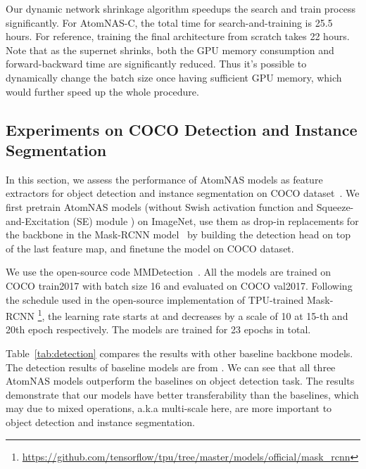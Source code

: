 \documentclass{article} \usepackage{iclr2020_conference,times}
\begin{document}
Our dynamic network shrinkage algorithm speedups the search and train process significantly. For AtomNAS-C, the total time for search-and-training is 25.5 hours. For reference, training the final architecture from scratch takes 22 hours.
Note that as the supernet shrinks, both the GPU memory consumption and forward-backward time are significantly reduced. Thus it's possible to dynamically change the batch size once having sufficient GPU memory, which would further speed up the whole procedure. 


\subsection{Experiments on COCO Detection and Instance Segmentation}
\label{sub:exp_coco}

In this section, we assess the performance of AtomNAS models as feature extractors for object detection and instance segmentation on COCO dataset~\citep{lin2014mscoco}. We first pretrain AtomNAS models (without Swish activation function \citep{ramachandran2018swish} and Squeeze-and-Excitation (SE) module \citep{hu2018se}) on ImageNet, use them as drop-in replacements for the backbone in the Mask-RCNN model~\citep{he2017maskrcnn} by building the detection head on top of the last feature map, and finetune the model on COCO dataset.

We use the open-source code MMDetection~\citep{kai2019mmdetection}. All the models are trained on COCO train2017 with batch size 16 and evaluated on COCO val2017. Following the schedule used in the open-source implementation of TPU-trained
Mask-RCNN \footnote{\url{https://github.com/tensorflow/tpu/tree/master/models/official/mask_rcnn}}, the learning rate starts at  and decreases by a scale of 10 at 15-th and 20th epoch respectively. The models are trained for 23 epochs in total.

Table~\ref{tab:detection} compares the results with other baseline backbone models. The detection results of baseline models are from \cite{stamoulis2019single_path_automl}. We can see that all three AtomNAS models outperform the baselines on object detection task. The results demonstrate that our models have better transferability than the baselines, which may due to mixed operations, a.k.a multi-scale here, are more important to object detection and instance segmentation.
\end{document}
